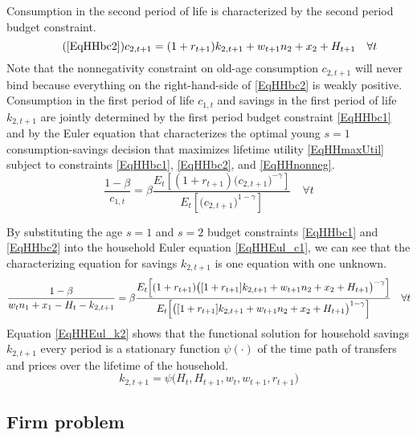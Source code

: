 \documentclass[letterpaper,12pt]{article}
\theoremstyle{definition}
\begin{document}
\begin{spacing}{1.5}
    Consumption in the second period of life is characterized by the second period budget constraint.
    \begin{equation}\tag{\ref{EqHHbc2}}
      c_{2,t+1} = (1+r_{t+1})k_{2,t+1} + w_{t+1}n_2 + x_2 + H_{t+1} \quad\forall t
    \end{equation}
    Note that the nonnegativity constraint on old-age consumption $c_{2,t+1}$ will never bind because everything on the right-hand-side of \eqref{EqHHbc2} is weakly positive. Consumption in the first period of life $c_{1,t}$ and savings in the first period of life $k_{2,t+1}$ are jointly determined by the first period budget constraint \eqref{EqHHbc1} and by the Euler equation that characterizes the optimal young $s=1$ consumption-savings decision that maximizes lifetime utility \eqref{EqHHmaxUtil} subject to constraints \eqref{EqHHbc1}, \eqref{EqHHbc2}, and \eqref{EqHHnonneg}.
    \begin{equation}\label{EqHHEul_c1}
      \frac{1-\beta}{c_{1,t}} = \beta \frac{E_t\left[(1 + r_{t+1})\bigl(c_{2,t+1}\bigr)^{-\gamma}\right]}{E_t\left[\bigl(c_{2,t+1}\bigr)^{1-\gamma}\right]} \quad\forall t
    \end{equation}

    By substituting the age $s=1$ and $s=2$ budget constraints \eqref{EqHHbc1} and \eqref{EqHHbc2} into the household Euler equation \eqref{EqHHEul_c1}, we can see that the characterizing equation for savings $k_{2,t+1}$ is one equation with one unknown.
    \begin{equation}\label{EqHHEul_k2}
      \frac{1-\beta}{w_t n_1 + x_1 - H_t - k_{2,t+1}} = \beta\frac{E_t\Bigl[(1 + r_{t+1})\bigl([1+r_{t+1}]k_{2,t+1} + w_{t+1}n_2 + x_2 + H_{t+1}\bigr)^{-\gamma}\Bigr]}{E_t\Bigl[\bigl([1+r_{t+1}]k_{2,t+1} + w_{t+1}n_2 + x_2 + H_{t+1}\bigr)^{1-\gamma}\Bigr]} \quad\forall t
    \end{equation}
    Equation \eqref{EqHHEul_k2} shows that the functional solution for household savings $k_{2,t+1}$ every period is a stationary function $\psi(\cdot)$ of the time path of transfers and prices over the lifetime of the household.
    \begin{equation}\label{EqHH_psi}
      k_{2,t+1} = \psi\bigl(H_t, H_{t+1}, w_t, w_{t+1}, r_{t+1}\bigr)
    \end{equation}


  \subsection{Firm problem}\label{SecModelFirm}


\end{spacing}
\end{document}
